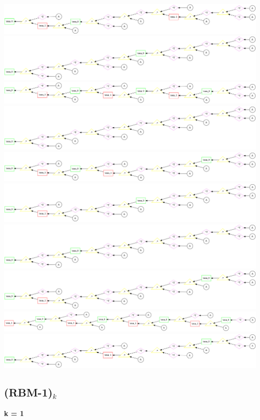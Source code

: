 \begin{center}
\includegraphics[width=0.45\linewidth]{trees/Sym_8_horizontal_12.png}
\includegraphics[width=0.45\linewidth]{trees/Sym_8_horizontal_13.png}
\includegraphics[width=0.45\linewidth]{trees/Sym_8_horizontal_14.png}
\includegraphics[width=0.45\linewidth]{trees/Sym_8_horizontal_15.png}
\includegraphics[width=0.45\linewidth]{trees/Sym_8_horizontal_16.png}
\includegraphics[width=0.45\linewidth]{trees/Sym_8_horizontal_17.png}
\includegraphics[width=0.45\linewidth]{trees/Sym_8_horizontal_18.png}
\includegraphics[width=0.45\linewidth]{trees/Sym_8_horizontal_19.png}
\includegraphics[width=0.45\linewidth]{trees/Sym_8_horizontal_20.png}
\includegraphics[width=0.45\linewidth]{trees/Sym_8_horizontal_21.png}
\end{center}


\subsection{{\bf (RBM-1)$_k$}}



{\bf k = 1}

